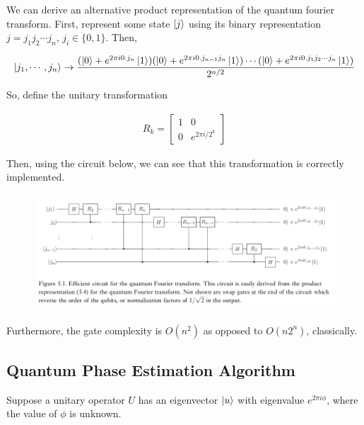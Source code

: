 \documentclass[main.tex]{subfiles}
\begin{document}
We can derive an alternative product representation of the quantum fourier transform. First, represent some state $\ket{j}$ using its binary representation $j=j_1j_2 \cdots j_n$, $j_i \in \{0, 1\}$. Then,

\begin{align*}
\ket{j_1 , \cdots , j_n } \rightarrow \frac{(\ket{0} + e^{2\pi i 0.j_n} \ket{1})(\ket{0} + e^{2\pi i 0.j_{n-1}j_n} \ket{1})\cdots (\ket{0} + e^{2\pi i 0.j_1j_2 \cdots j_n} \ket{1})}{2^{n/2}}
\end{align*}

So, define the unitary transformation

\begin{align}
	R_k = \begin{bmatrix}
 1 & 0 \\ 0 & e^{2\pi i / 2^k}
 \end{bmatrix}
\end{align}

Then, using the circuit below, we can see that this transformation is correctly implemented.

\begin{figure}[H]
\centering
\includegraphics[width=\linewidth]{images/qfft.png}
\end{figure}

Furthermore, the gate complexity is $O(n^2)$ as opposed to $O(n2^n)$, classically.

\subsection{Quantum Phase Estimation Algorithm}\label{phase_estimation}

Suppose a unitary operator $U$ has an eigenvector $\ket{u}$ with eigenvalue $e^{2\pi i \phi}$, where the value of $\phi$ is unknown.
\end{document}
